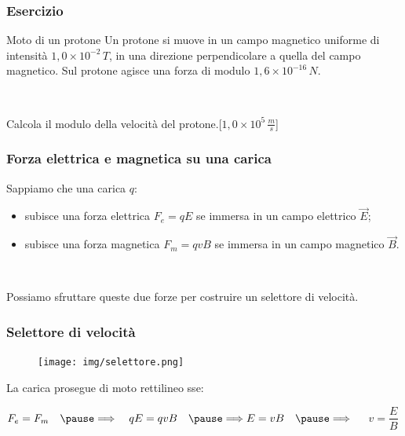 \documentclass[]{beamer}
\theoremstyle{plain}
\begin{document}
\begin{frame}
\frametitle{Esercizio}
\begin{exampleblock}{Moto di un protone}
  Un protone si muove in un campo magnetico uniforme di intensità $ 1,0 \times 10^{-2} \, T $, in una direzione perpendicolare a quella del campo magnetico. Sul protone agisce una forza di modulo $ 1,6 \times 10^{-16} \, N $.

  ~

  Calcola il modulo della velocità del protone.\hspace{\fill}[$ 1,0 \times 10^{5} \, \frac{m}{s} $]
\end{exampleblock} 
\end{frame}

\begin{frame}
\frametitle{Forza elettrica e magnetica su una carica}
Sappiamo che una carica $ q $:
\begin{itemize}
  \item subisce una forza elettrica $ F_e = qE $ se immersa in un campo elettrico $ \vec{E} $;\pause
  \item subisce una forza magnetica $ F_m = qvB $ se immersa in un campo magnetico $ \vec{B} $.
\end{itemize}\pause

~

Possiamo sfruttare queste due forze per costruire un \alert{selettore di velocità}.
\end{frame}


\begin{frame}
\frametitle{Selettore di velocità}
\begin{figure}
\texttt{[image: img/selettore.png]}
\end{figure}\pause
La carica prosegue di moto rettilineo sse:
\begin{center}
$ F_e = F_m ~~~ \pause\Longrightarrow ~~~ qE = qvB ~~~ \pause\Longrightarrow E = vB ~~~\pause\Longrightarrow$~~~\colorbox{blue!30}{$ v = \dfrac{E}{B} $} 
\end{center} 
\end{frame}
\end{document}
